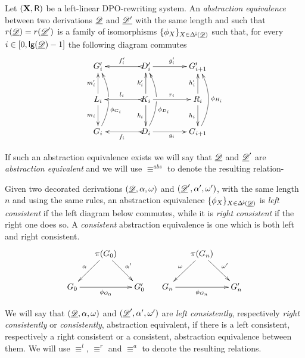 \begin{definition}Let $(\textbf {\textup{X}}, \mathsf{R})$ be a left-linear DPO-rewriting system. An \emph{abstraction equivalence} between two derivations $\underline{\mathscr{D}}$ and $\underline{\mathscr{D'}}$ with the same length and such that $r(\underline{\mathscr{D}})=r(\underline{\mathscr{D}}')$ is a family of isomorphisms $\{\phi_X\}_{X\in \Delta^{\hspace{-1pt}\downarrow\hspace{-1pt}}(\underline{\mathscr{D}})}$ such that, for every $i\in [0, \mathsf{lg}(\underline{\mathscr{D}})-1]$ the following diagram commutes
	\[\xymatrix@C=40pt{G'_i&D'_i \ar[r]^{g'_i} \ar@{>->}[l]_{f'_i}&G'_{i+1}\\  L_i \ar[u]^{m'_i} \ar[d]_{m_i}& K_i \ar[u]^{k'_i} \ar[d]_{k_i} \ar[r]^{r_i} \ar@{>->}[l]_{l_i} &R_i\ar[u]^{h'_i} \ar[d]_{h_i}\\G_i \ar@/_.45cm/[uu]_(.35){\phi_{G_i}}|\hole&D_i\ar@{>->}[l]^{f_i}\ar@/_.45cm/[uu]_(.35){\phi_{D_i}}|\hole \ar[r]_{g_i}&G_{i+1}\ar@/_.45cm/[uu]_{\phi_{H_i}}}\]
	
	If such an abstraction equivalence exists we will say that $\underline{\mathscr{D}}$ and $\underline{\mathscr{D}}'$ are \emph{abstraction equivalent} and we will use $\equiv^{abs}$ to denote the resulting relation-
	
Given two decorated derivations $(\underline{\mathscr{D}}, \alpha, \omega)$  and $(\underline{\mathscr{D}}', \alpha', \omega')$, with the same length $n$ and using the same rules, an abstraction equivalence $\{\phi_X\}_{X\in \Delta^{\hspace{-1pt}\downarrow\hspace{-1pt}}(\underline{\mathscr{D}})}$ is \emph{left consistent} if the left diagram below commutes, while it is \emph{right consistent} if the right one does so. A \emph{consistent} abstraction equivalence  is one which is both left and right consistent.
\[\xymatrix@C=15pt{&\pi(G_0) \ar[dr]^{\alpha'} \ar[dl]_{\alpha}&&& \pi(G_{n}) \ar[dr]^{\omega'} \ar[dl]_{\omega}\\ G_0 \ar[rr]_{\phi_{G_0}} && G'_0 &G_{n} \ar[rr]_{\phi_{G_{n}}} && G'_{n} } \]
	
We will say that $(\underline{\mathscr{D}}, \alpha, \omega)$  and $(\underline{\mathscr{D}}', \alpha', \omega')$ are \emph{left consistently}, respectively \emph{right consistently} or \emph{consistently}, abstraction equivalent, if there is a left consistent, respectively a right consistent or a consistent, abstraction equivalence between them. We will use $\equiv^{l}$, $\equiv^{r}$ and $\equiv^{a}$ to denote the resulting relations.
\end{definition}

